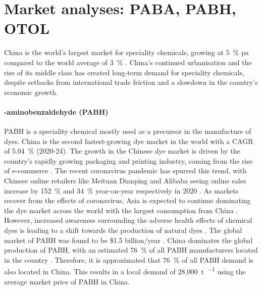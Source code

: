 \section{Market analyses: PABA, PABH, OTOL}
\label{sec:market-analysis}
China is the world’s largest market for speciality chemicals, growing at \SI{5}{\percent} pa compared to the world average of \SI{3}{\percent} \cite{blad_game_nodate}. China’s continued urbanisation and the rise of its middle class has created long-term demand for speciality chemicals, despite setbacks from international trade friction and a slowdown in the country’s economic growth.

\paragraph{\para-aminobenzaldehyde (PABH)}
PABH is a speciality chemical mostly used as a precursor in the manufacture of dyes. China is the second fastest-growing dye market in the world with a CAGR of \SI{5.04}{\percent} (2020-24). The growth in the Chinese dye market is driven by the country’s rapidly growing packaging and printing industry, coming from the rise of e-commerce \cite{reportlinker_synthetic_2021}. The recent coronavirus pandemic has spurred this trend, with Chinese online retailers like Meituan Dianping and Alibaba seeing online sales increase by \SI{152}{\percent} and \SI{34}{\percent} year-on-year respectively in 2020 \cite{kharpal_chinas_2020}. As markets recover from the effects of coronavirus, Asia is expected to continue dominating the dye market across the world with the largest consumption from China \cite{mordor_intelligence_dyes_2020}. However, increased awareness surrounding the adverse health effects of chemical dyes is leading to a shift towards the production of natural dyes \cite{reportlinker_synthetic_2021}. The global market of PABH was found to be \$1.5 billion/year \cite{report_express_global_2020}. China dominates the global production of PABH, with an estimated \SI{76}{\percent} of all PABH manufacturers located in the country \cite{molbase_chemical_e-commerce_4-amino-benzaldehyde_2020,panjiva_manufacturers_2021,chemexper_chemical_nodate}. Therefore, it is approximated that \SI{76}{\percent} of all PABH demand is also located in China. This results in a local demand of 28,\SI{000}{\tonne\per\year} using the average market price of PABH in China.

